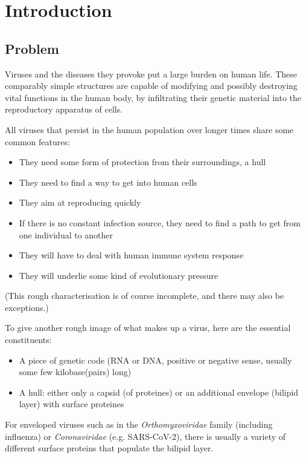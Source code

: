 
\section{Introduction}

\subsection{Problem}

Viruses and the diseases they provoke put a large burden on human life. These comparably simple structures are capable of modifying and possibly destroying vital functions in the human body, by infiltrating their genetic material into the reproductory apparatus of cells.

All viruses that persist in the human population over longer times share some common features:
\begin{itemize}
  \item They need some form of protection from their surroundings, a hull
  \item They need to find a way to get into human cells
  \item They aim at reproducing quickly
  \item If there is no constant infection source, they need to find a path to get from one individual to another
  \item They will have to deal with human immune system response
  \item They will underlie some kind of evolutionary pressure
\end{itemize}

(This rough characterisation is of course incomplete, and there may also be exceptions.)

To give another rough image of what makes up a virus, here are the essential constituents:
\begin{itemize}
  \item A piece of genetic code (RNA or DNA, positive or negative sense, usually some few kilobase(pairs) long)
  \item A hull: either only a capsid (of proteines) or an additional envelope (bilipid layer) with surface proteines
\end{itemize}

For enveloped viruses such as in the \textit{Orthomyxoviridae} family (including influenza) or \textit{Coronaviridae} (e.g. SARS-CoV-2), there is usually a variety of different surface proteins that populate the bilipid layer.


